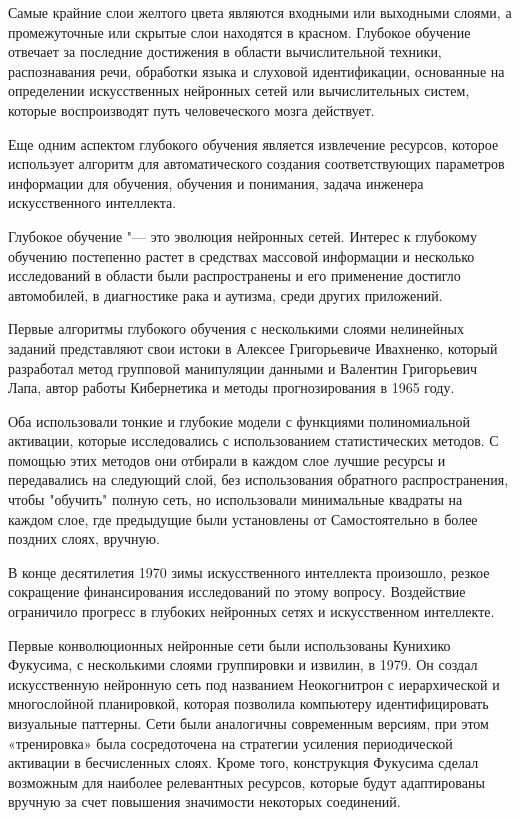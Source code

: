 
 Самые крайние слои желтого цвета являются входными или выходными слоями, 
 а промежуточные или скрытые слои находятся в красном. 
 Глубокое обучение отвечает за последние достижения в области вычислительной техники, 
 распознавания речи, обработки языка и слуховой идентификации,
 основанные на определении искусственных нейронных сетей или вычислительных систем,
 которые воспроизводят путь человеческого мозга действует. 

 Еще одним аспектом глубокого обучения является извлечение ресурсов, 
 которое использует алгоритм для автоматического создания соответствующих параметров информации для обучения,
 обучения и понимания, задача инженера искусственного интеллекта.

 Глубокое обучение "--- это эволюция нейронных сетей.
 Интерес к глубокому обучению постепенно растет в средствах массовой
 информации и несколько исследований в области были распространены и
 его применение достигло автомобилей, в диагностике рака и аутизма,
 среди других приложений.

 Первые алгоритмы глубокого обучения с несколькими слоями нелинейных заданий представляют свои истоки в Алексее Григорьевиче Ивахненко, 
 который разработал метод групповой манипуляции данными и Валентин Григорьевич Лапа, 
 автор работы Кибернетика и методы прогнозирования в 1965 году.

 Оба использовали тонкие и глубокие модели с функциями полиномиальной активации, 
 которые исследовались с использованием статистических методов. 
 С помощью этих методов они отбирали в каждом слое лучшие ресурсы и передавались на следующий слой, 
 без использования обратного распространения, чтобы "обучить" полную сеть, 
 но использовали минимальные квадраты на каждом слое,
 где предыдущие были установлены от Самостоятельно в более поздних слоях, вручную.


 В конце десятилетия 1970 зимы искусственного интеллекта произошло, 
 резкое сокращение финансирования исследований по этому вопросу.
 Воздействие ограничило прогресс в глубоких нейронных сетях и искусственном интеллекте. 

 Первые конволюционных нейронные сети были использованы Кунихико Фукусима, 
 с несколькими слоями группировки и извилин, в 1979. 
 Он создал искусственную нейронную сеть под названием Неокогнитрон 
 с иерархической и многослойной планировкой,
 которая позволила компьютеру идентифицировать визуальные паттерны. 
 Сети были аналогичны современным версиям, при этом «тренировка» была сосредоточена на стратегии усиления периодической активации в бесчисленных слоях. 
 Кроме того, конструкция Фукусима сделал возможным для наиболее релевантных ресурсов, 
 которые будут адаптированы вручную за счет повышения значимости некоторых соединений. 

